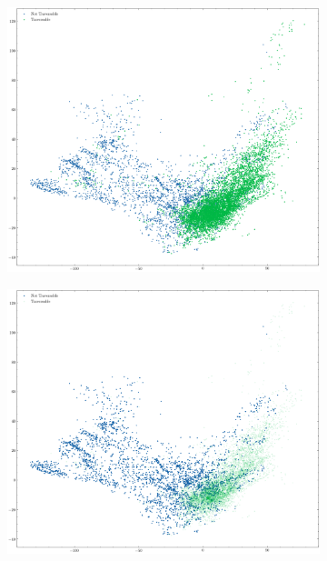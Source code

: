 \documentclass[../document.tex]{subfiles}
\begin{document}
\begin{figure}[H]
    \centering
    \begin{subfigure}[b]{1\textwidth}
        \includegraphics[width=\linewidth]{../img/5/pca/pca-test.png}
    \end{subfigure}
    \begin{subfigure}[b]{0.48\textwidth}
        \includegraphics[width=\linewidth]{../img/5/pca/pca-test-0.png}
    \end{subfigure}
    \begin{subfigure}[b]{0.48\textwidth}

\end{subfigure}
\end{figure}
\end{document}

